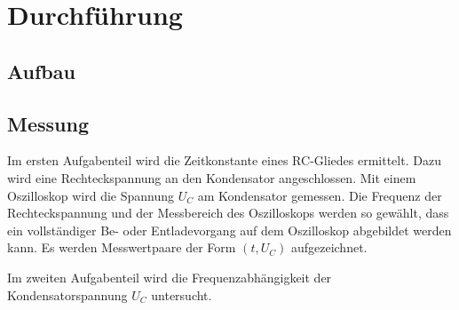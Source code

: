 \section{Durchführung}
\label{sec:Durchführung}

\subsection{Aufbau}
\label{sec:Aufbau}

\subsection{Messung}
\label{sec:Messung}

Im ersten Aufgabenteil wird die Zeitkonstante eines RC-Gliedes ermittelt.
Dazu wird eine Rechteckspannung an den Kondensator angeschlossen. Mit einem Oszilloskop wird die Spannung $U_C$ am Kondensator gemessen.
Die Frequenz der Rechteckspannung und der Messbereich des Oszilloskops werden so gewählt, dass ein vollständiger Be- oder Entladevorgang
auf dem Oszilloskop abgebildet werden kann. Es werden Messwertpaare der Form $(t, U_C)$ aufgezeichnet.

Im zweiten Aufgabenteil wird die Frequenzabhängigkeit der Kondensatorspannung $U_C$ untersucht.%